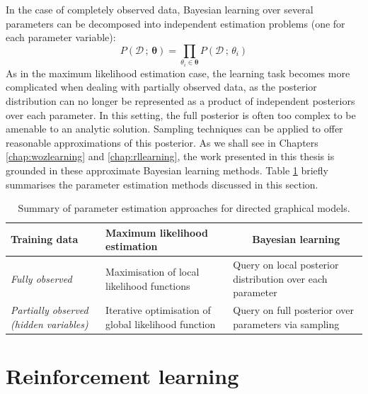 In the case of completely observed data, Bayesian learning over several parameters can be decomposed into independent estimation problems (one for each parameter variable): 
\begin{equation}
P(\mathcal{D} \, ; \, \boldsymbol\theta) = \prod_{\theta_i \in \boldsymbol\theta} P(\mathcal{D} \, ; \, \theta_i)
\end{equation}
As in the maximum likelihood estimation case, the learning task becomes more complicated when dealing with partially observed data, as the posterior distribution can no longer be represented as a product of independent posteriors over each parameter.  In this setting, the full posterior is often too complex to be amenable to an analytic solution.  Sampling techniques can be applied to offer reasonable approximations of this posterior.  As we shall see in Chapters \ref{chap:wozlearning} and \ref{chap:rllearning}, the work presented in this thesis is grounded in these approximate Bayesian learning methods. Table \ref{table:gmlearning} briefly summarises the parameter estimation methods discussed in this section.

\begin{table}[ht]
\renewcommand{\arraystretch}{1.8}
\setlength{\tabcolsep}{10pt}
\vspace{3mm}
\begin{center}
\begin{tabular}{|p{30mm}||p{42mm}|p{48mm}|} \hline 
\centering \textbf{Training data} & \centering \textbf{Maximum likelihood estimation} &  $\ \ \ \ \ \ \ $ \textbf{Bayesian learning} \\ \hline
\textit{Fully observed} & Maximisation of local $\phantom{aa}$ likelihood functions & Query on local posterior distribution over each parameter \\
\textit{Partially observed (hidden variables)} &  Iterative optimisation of global likelihood function &  Query on full posterior over parameters via sampling \vspace{2mm} \\  \hline
\end{tabular}
\end{center}
\caption{Summary of parameter estimation approaches for directed graphical models.}
\label{table:gmlearning}
\end{table}


\section{Reinforcement learning}
\label{sec:rl}

